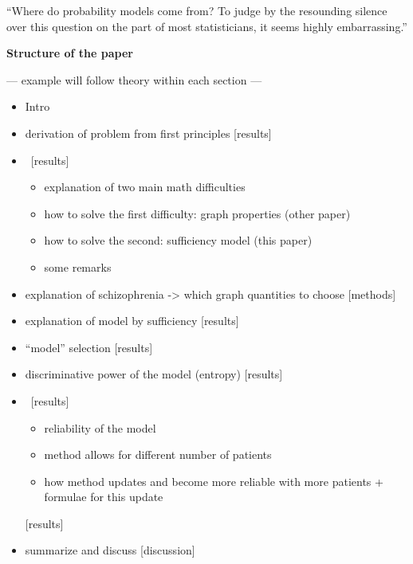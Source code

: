 \documentclass[\ifafour a4paper,12pt,\else a5paper,10pt,\fi%
onecolumn,oneside,article,%
british%
]{memoir}
\theoremstyle{remark}
\theoremstyle{innote}
\newcommand*{\citep}{\parencites}
\renewcommand*{\|}{\mathpunct{|}}
\theoremstyle{plain}
\begin{document}








\bigskip

\enquote{Where do probability models come from? To judge by the resounding
  silence over this question on the part of most statisticians, it seems
  highly embarrassing.} \citep{dawid1982}

\bigskip



\textbf{\Large Structure of the paper}

--- example will follow theory within each section ---

\begin{itemize}
  \item Intro
\item derivation of problem from first principles [results]
\item  \ [results] \begin{itemize}
   \item explanation of two main math difficulties 
  \item how to solve the first difficulty: graph properties (other paper)
  \item how to solve the second: sufficiency model (this paper)
\item some remarks
  \end{itemize}
\item explanation of schizophrenia -> which graph quantities to choose
  [methods]
\item explanation of model by sufficiency [results]
\item \enquote{model} selection [results]
\item discriminative power of the model (entropy) [results]
\item \ [results]
  \begin{itemize}
  \item reliability of the model
  \item method allows for different number of patients
  \item how method updates and become more reliable with more patients +
    formulae for this update
  \end{itemize}
  [results]
\item summarize and discuss [discussion]
\end{itemize}
\end{document}
